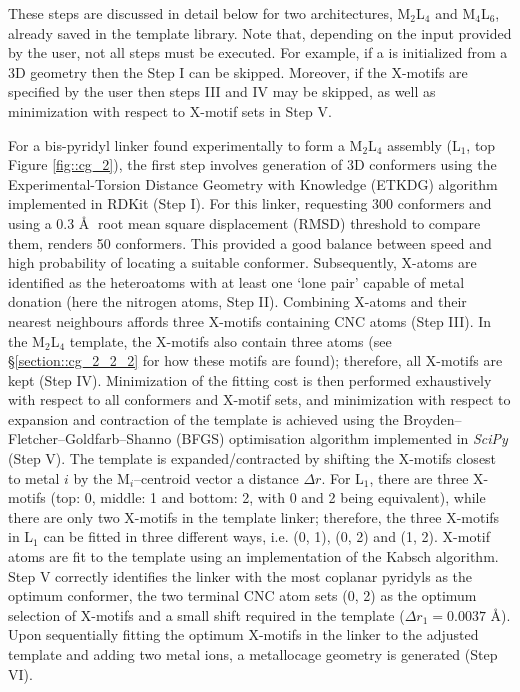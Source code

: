 \documentclass[../../main.tex]{subfiles}
\newcommand{\MLf}{M$_2$L$_4$ }
\begin{document}
These steps are discussed in detail below for two architectures, \MLf and M$_4$L$_6$, already saved in the template library. Note that, depending on the input provided by the user, not all steps must be executed. For example, if a  is initialized from a 3D geometry then the Step I can be skipped. Moreover, if the X-motifs are specified by the user then steps III and IV may be skipped, as well as minimization with respect to X-motif sets in Step V.

For a bis-pyridyl linker found experimentally to form a \MLf assembly (L${}_1$, top Figure \ref{fig::cg_2}),\cite{MartCentelles2018} the first step involves generation of 3D conformers using the Experimental-Torsion Distance Geometry with Knowledge (ETKDG) algorithm\cite{Riniker2015} implemented in RDKit\cite{Landrum2019} (Step I). For this linker, requesting 300 conformers and using a 0.3 \AA$\;$ root mean square displacement (RMSD) threshold to compare them, renders 50 conformers. This provided a good balance between speed and high probability of locating a suitable conformer. Subsequently, X-atoms are identified as the heteroatoms with at least one ‘lone pair’ capable of metal donation (here the nitrogen atoms, Step II). Combining X-atoms and their nearest neighbours affords three X-motifs containing CNC atoms (Step III). In the \MLf template, the X-motifs also contain three atoms (see §\ref{section::cg_2_2_2} for how these motifs are found); therefore, all X-motifs are kept (Step IV). Minimization of the fitting cost is then performed exhaustively with respect to all conformers and X-motif sets, and minimization with respect to expansion and contraction of the template is achieved using the Broyden–Fletcher–Goldfarb–Shanno (BFGS) optimisation algorithm implemented in \emph{SciPy}\cite{SciPy} (Step V). The template is expanded/contracted by shifting the X-motifs closest to metal $i$ by the M$_i$–centroid vector a distance $\Delta r$. For L${}_1$, there are three X-motifs (top: 0, middle: 1 and bottom: 2, with 0 and 2 being equivalent), while there are only two X-motifs in the template linker; therefore, the three X-motifs in L${}_1$ can be fitted in three different ways, i.e. (0, 1), (0, 2) and (1, 2). X-motif atoms are fit to the template using an implementation of the Kabsch algorithm.\cite{Kabsch1976} Step V correctly identifies the linker with the most coplanar pyridyls as the optimum conformer, the two terminal CNC atom sets (0, 2) as the optimum selection of X-motifs and a small shift required in the template ($\Delta r_1 = 0.0037$ \AA). Upon sequentially fitting the optimum X-motifs in the linker to the adjusted template and adding two metal ions, a metallocage geometry is generated (Step VI). 
\end{document}
